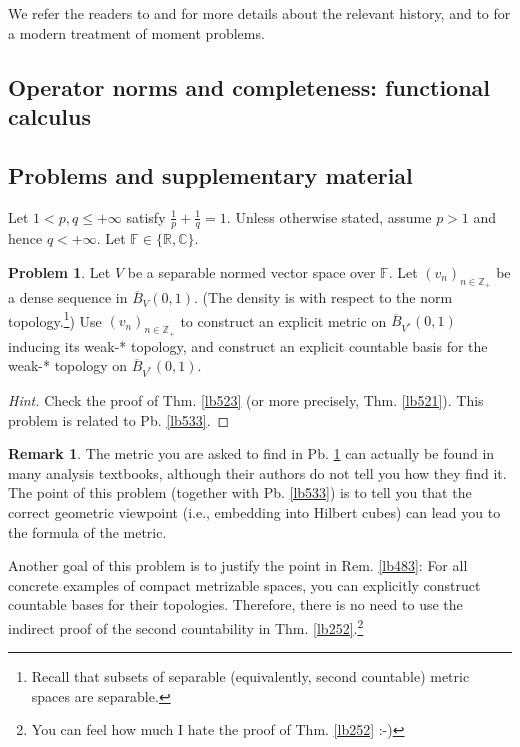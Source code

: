 \documentclass[12pt,b5paper,notitlepage]{article}
\theoremstyle{definition}
\newtheorem{rem}[df]{Remark}
\newtheorem{prob}{\color{red}Problem}[section]
\theoremstyle{plain}
\newcommand{\ovl}{\overline}
\newcommand{\Cbb}{\mathbb C}
\newcommand{\Zbb}{\mathbb Z}
\newcommand{\Rbb}{\mathbb R}
\newcommand{\Fbb}{\mathbb F}
\numberwithin{equation}{section}
\begin{document}
We refer the readers to \cite[Ch. VI]{Die-H} and \cite{NB97} for more details about the relevant history, and to \cite[Sec. 4.17 \& 5.6]{Sim-R} for a modern treatment of moment problems.



\subsection{Operator norms and completeness: functional calculus}





\hypertarget{beforeindex}{}






\subsection{Problems and supplementary material}


Let $1<p,q\leq +\infty$ satisfy $\frac 1p+\frac 1q=1$. Unless otherwise stated, assume $p>1$ and hence $q<+\infty$. Let $\Fbb\in\{\Rbb,\Cbb\}$. 


\begin{prob}\label{lb535}
Let $V$ be a separable normed vector space over $\Fbb$. Let $(v_n)_{n\in\Zbb_+}$ be a dense sequence in $\ovl B_V(0,1)$. (The density is with respect to the norm topology.\footnote{Recall that subsets of separable (equivalently, second countable) metric spaces are separable.}) Use $(v_n)_{n\in\Zbb_+}$ to construct an explicit metric on $\ovl B_{V^*}(0,1)$ inducing its weak-* topology, and construct an explicit countable basis for the weak-* topology on $\ovl B_{V^*}(0,1)$.
\end{prob}

\begin{proof}[Hint]
Check the proof of Thm. \ref{lb523} (or more precisely, Thm. \ref{lb521}). This problem is related to Pb. \ref{lb533}.
\end{proof}


\begin{rem}
The metric you are asked to find in Pb. \ref{lb535} can actually be found in many analysis textbooks, although their authors do not tell you how they find it. The point of this problem (together with Pb. \ref{lb533}) is to tell you that the correct geometric viewpoint (i.e., embedding into Hilbert cubes) can lead you to the formula of the metric. 

Another goal of this problem is to justify the point in Rem. \ref{lb483}: For all concrete examples of compact metrizable spaces, you can explicitly construct countable bases for their topologies. Therefore, there is no need to use the indirect proof of the second countability in Thm. \ref{lb252}.\footnote{You can feel how much I hate the proof of Thm. \ref{lb252} :-)}  \hfill\qedsymbol
\end{rem}
\end{document}
